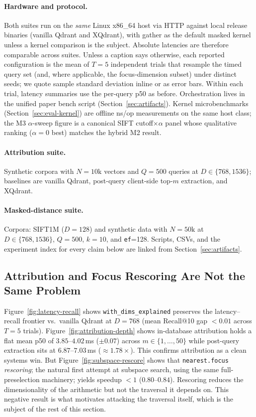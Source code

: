 \documentclass[sigconf,review,balance=false]{acmart}
\begin{document}
\paragraph{Hardware and protocol.} Both suites run on the \emph{same} Linux
x86\_64 host via HTTP against local release binaries (vanilla Qdrant and
XQdrant), with gather as the default masked kernel unless a kernel comparison
is the subject. Absolute latencies are therefore comparable across suites.
Unless a caption says otherwise, each reported configuration is the mean of
$T{=}5$ independent trials that resample the timed query set (and, where
applicable, the focus-dimension subset) under distinct seeds; we quote sample
standard deviation inline or as error bars. Within each trial, latency
summaries use the per-query p50 as before. Orchestration lives in the unified
paper bench script (Section~\ref{sec:artifacts}). Kernel microbenchmarks
(Section~\ref{sec:eval-kernel}) are offline ns/op measurements on the same
host class; the M3 $\alpha$-sweep figure is a canonical SIFT
cutoff$\times\alpha$ panel whose qualitative ranking ($\alpha{=}0$ best)
matches the hybrid M2 result.

\paragraph{Attribution suite.} Synthetic corpora with $N{=}10\mathrm{k}$
vectors and $Q{=}500$ queries at $D\in\{768,1536\}$; baselines are vanilla
Qdrant, post-query client-side top-$m$ extraction, and XQdrant.

\paragraph{Masked-distance suite.} Corpora: SIFT1M ($D{=}128$) and synthetic
data with $N{=}50\mathrm{k}$ at $D\in\{768,1536\}$, $Q{=}500$, $k{=}10$,
and \texttt{ef}=128. Scripts, CSVs, and the experiment index for every claim
below are linked from Section~\ref{sec:artifacts}.

\subsection{Attribution and Focus Rescoring Are Not the Same Problem}
\label{sec:eval-attr}

Figure~\ref{fig:latency-recall} shows \texttt{with\_dims\_explained} preserves
the latency--recall frontier vs.\ vanilla Qdrant at $D{=}768$ (mean Recall@10
gap $<0.01$ across $T{=}5$ trials). Figure~\ref{fig:attribution-depth} shows
in-database attribution holds a flat mean p50 of $3.85$--$4.02$\,ms
($\pm\!0.07$) across $m\in\{1,\ldots,50\}$ while post-query extraction sits
at $6.87$--$7.03$\,ms ($\approx 1.78\times$). This confirms attribution as a
clean systems win. But Figure~\ref{fig:subspace-rescore} shows that
\texttt{nearest.focus} \emph{rescoring}; the natural first attempt at
subspace search, using the same full-preselection machinery; yields speedup
$<1$ ($0.80$--$0.84$). Rescoring reduces the dimensionality of the arithmetic
but not the traversal it depends on. This negative result is what motivates
attacking the traversal itself, which is the subject of the rest of this
section.
\end{document}
